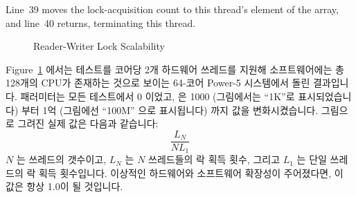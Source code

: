Line~39 moves the lock-acquisition count to this thread's element of the
 array, and line~40 returns, terminating this thread.
\fi

\begin{figure}[tb]
\centering
{}
\caption{Reader-Writer Lock Scalability}
\label{fig:toolsoftrade:Reader-Writer Lock Scalability}
\end{figure}

Figure~\ref{fig:toolsoftrade:Reader-Writer Lock Scalability} 에서는 테스트를
코어당 2개 하드웨어 쓰레드를 지원해 소프트웨어에는 총 128개의 CPU가 존재하는
것으로 보이는 64-코어 Power-5 시스템에서 돌린 결과입니다.
 패러미터는 모든 테스트에서 0 이었고,  은 1000
(그림에서는 ``1K''로 표시되었습니다) 부터 1억 (그림에선 ``100M'' 으로
표시됩니다) 까지 값을 변화시켰습니다.
그림으로 그려진 실제 값은 다음과 같습니다:
\begin{equation}
	\frac{L_N}{N L_1}
\end{equation}
$N$ 는 쓰레드의 갯수이고, $L_N$ 는 $N$ 쓰레드들의 락 획득 횟수, 그리고 $L_1$ 는
단일 쓰레드의 락 획득 횟수입니다.
이상적인 하드웨어와 소프트웨어 확장성이 주어졌다면, 이 값은 항상 1.0이 될
것입니다.

